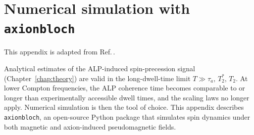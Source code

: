 \appendix

\chapter{Numerical simulation with \texttt{axionbloch}}\label{app:axionbloch}
\begin{jointwork}
    This appendix is adapted from Ref.\,\cite{Zhang_axionbloch}.
\end{jointwork}

Analytical estimates of the ALP-induced spin-precession signal (Chapter~\ref{chap:theory}) are valid in the long-dwell-time limit $T \gg \tau_a,\,T_2^*,\,T_2$.
At lower Compton frequencies, the ALP coherence time becomes comparable to or longer than experimentally accessible dwell times, and the scaling laws no longer apply.
Numerical simulation is then the tool of choice.
This appendix describes \texttt{axionbloch}, an open-source Python package that simulates spin dynamics under both magnetic and axion-induced pseudomagnetic fields.






